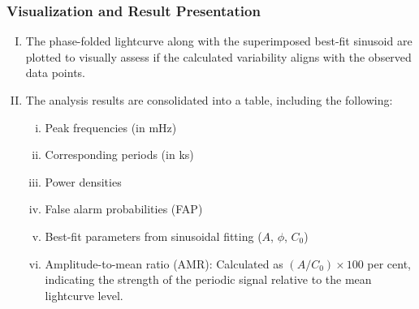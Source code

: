     		\subsubsection{Visualization and Result Presentation}
    			\begin{enumerate}[I.]
    				\item The phase-folded lightcurve along with the superimposed best-fit sinusoid are plotted to visually assess if the calculated variability aligns with the observed data points.
    				\item The analysis results are consolidated into a table, including the following:
    				\begin{enumerate}[i.]
    					\item Peak frequencies (in mHz)
    					\item Corresponding periods (in ks)
    					\item Power densities
    					\item False alarm probabilities (FAP)
    					\item Best-fit parameters from sinusoidal fitting ($A$, $\phi$, $C_0$)
    					\item Amplitude-to-mean ratio (AMR): Calculated as $(A/C_0)\times 100$ per cent, indicating the strength of the periodic signal relative to the mean lightcurve level.
    				\end{enumerate}
    			\end{enumerate}
    			
	\setcounter{footnotecount}{\value{footnote}}
